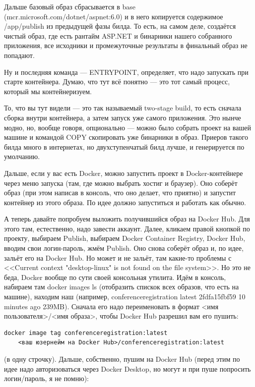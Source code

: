 \documentclass{../../text-style}
\begin{document}
Дальше базовый образ сбрасывается в base (mcr.microsoft.com/dotnet/aspnet:6.0) и в него копируется содержимое /app/publish из предыдущей фазы билда. То есть, на самом деле, создаётся чистый образ, где есть рантайм ASP.NET и бинарники нашего собранного приложения, все исходники и промежуточные результаты в финальный образ не попадают.

Ну и последняя команда --- ENTRYPOINT, определяет, что надо запускать при старте контейнера. Думаю, что тут всё понятно --- это тот самый процесс, который мы контейнеризуем.

То, что вы тут видели --- это так называемый two-stage build, то есть сначала сборка внутри контейнера, а затем запуск уже самого приложения. Это нынче модно, но, вообще говоря, опционально --- можно было собрать проект на вашей машине и командой COPY скопировать уже бинарники в образ. Приеров такого билда много в интернетах, но двухступенчатый билд лучше, и генерируется по умолчанию.

Дальше, если у вас есть Docker, можно запустить проект в Docker-контейнере через меню запуска (там, где можно выбрать хостиг и браузер). Оно соберёт образ (при этом написав в консоль, что оно делает, что приятно) и запустит контейнер из этого образа. По идее должно запуститься и работать как обычно.

А теперь давайте попробуем выложить получившийся образ на Docker Hub. Для этого там, естественно, надо завести аккаунт. Далее, кликаем правой кнопкой по проекту, выбираем Publish, выбираем Docker Container Registry, Docker Hub, вводим свои логин-пароль, жмём Publish. Оно снова соберёт образ и, по идее, зальёт его на Docker Hub. Но может и не зальёт, там какие-то проблемы с <<Current context "desktop-linux" is not found on the file system>>. Но это не беда, Docker вообще по сути своей консольная утилита. Идём в консоль, набираем там docker images ls (отобразить спискок всех образов, что есть на машине), находим наш (например, conferenceregistration latest 2fdfa15fbf59 10 minutes ago 239MB). Сначала его надо переименовать в формат <имя пользователя>/<имя образа>, чтобы Docker Hub разрешил вам его пушить:

\begin{verbatim}
docker image tag conferenceregistration:latest 
    <ваш юзернейм на Docker Hub>/conferenceregistration:latest
\end{verbatim}

(в одну строчку). Дальше, собственно, пушим на Docker Hub (перед этим по идее надо авторизоваться через Docker Desktop, но могут и при пуше попросить логин/пароль, я не помню):
\end{document}
